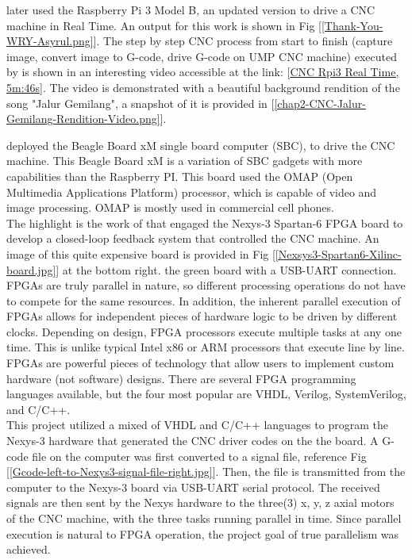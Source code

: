 \cite{Ahmad:2017} later used the Raspberry Pi 3 Model B, an updated version to drive a CNC machine in Real Time. An output for this work is shown in Fig [\ref{Thank-You-WRY-Asyrul.png}]. The step by step CNC process from start to finish (capture image, convert image to G-code, drive G-code on UMP CNC machine) executed by \cite{Ahmad:2017} is shown in an interesting video accessible at the link: [\href{https://www.youtube.com/watch?v=4s94wy6ZGJE}{CNC Rpi3 Real Time, 5m:46s}]. The video is demonstrated with a beautiful background rendition of the song "Jalur Gemilang", a snapshot of it is provided in [\ref{chap2-CNC-Jalur-Gemilang-Rendition-Video.png}].

\clearpage
\pagebreak

\cite{Selvarajah:2015} deployed the Beagle Board xM single board computer (SBC), to drive the CNC machine. This Beagle Board xM is a variation of SBC gadgets with more capabilities than the Raspberry PI. This board used the OMAP (Open Multimedia Applications Platform) processor, which is capable of video and image processing. OMAP is mostly used in commercial cell phones.\\ 

The highlight is the work of \cite{Teh:2016} that engaged the Nexys-3 Spartan-6 FPGA board to develop a closed-loop feedback system that controlled the CNC machine. An image of this quite expensive board is provided in Fig [\ref{Nexsys3-Spartan6-Xilinc-board.jpg}] at the bottom right. the green board with a USB-UART connection. \\

FPGAs are truly parallel in nature, so different processing operations do not have to compete for the same resources. In addition, the inherent parallel execution of FPGAs allows for independent pieces of hardware logic to be driven by different clocks. Depending on design, FPGA processors execute multiple tasks at any one time. This is unlike typical Intel x86 or ARM processors that execute line by line.\\

FPGAs are powerful pieces of technology that allow users to implement custom hardware (not software) designs. There are several FPGA programming languages available, but the four most popular are VHDL, Verilog, SystemVerilog, and C/C++. \\

This project utilized a mixed of VHDL and C/C++ languages to program the Nexys-3 hardware that generated the CNC driver codes on the the board. A G-code file on the computer was first converted to a signal file, reference Fig [\ref{Gcode-left-to-Nexys3-signal-file-right.jpg}]. Then, the file is transmitted from the computer to the Nexys-3 board via USB-UART serial protocol. The received signals are then sent by the Nexys hardware to the three(3) x, y, z axial motors of the CNC machine, with the three tasks running parallel in time. Since parallel execution is natural to FPGA operation, the project goal of true parallelism was achieved.\\

